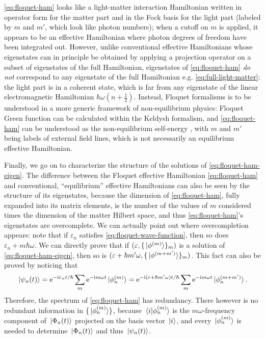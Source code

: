 \documentclass[hyperref, a4paper]{article}
\newcommand*{\ii}{\mathrm{i}}
\newcommand*{\ee}{\mathrm{e}}
\begin{document}
\eqref{eq:floquet-ham} looks like a light-matter interaction Hamiltonian 
written in operator form for the matter part 
and in the Fock basis for the light part (labeled by $m$ and $m'$, which look like photon numbers);
when a cutoff on $m$ is applied, 
it appears to be an effective Hamiltonian where photon degrees of freedom 
have been integrated out.
However, unlike conventional effective Hamiltonians
whose eigenstates can in principle be obtained by 
applying a projection operator on a subset of eigenstates of the full Hamiltonian,
eigenstates of \eqref{eq:floquet-ham} 
\emph{do not} correspond to any eigenstate of 
the full Hamiltonian e.g. \eqref{eq:full-light-matter}:
the light part is in a coherent state,
which is far from any eigenstate of the linear electromagnetic Hamiltonian $\hbar \omega (n + \frac{1}{2})$.
Instead, Floquet formalisms is to be understood in a more generic framework of non-equilibrium physics:
Floquet Green function can be calculated within the Keldysh formalism,
and \eqref{eq:floquet-ham} can be understood as the 
non-equilibrium self-energy \cite{lubatsch2019evolution,aoki2014nonequilibrium},
with $m$ and $m'$ being labels of external field lines,
which is not necessarily an equilibrium effective Hamiltonian.

Finally, we go on to characterize the structure of the solutions of  \eqref{eq:floquet-ham-eigen}.
The difference between the Floquet effective Hamiltonian \eqref{eq:floquet-ham}
and conventional, ``equilibrium'' effective Hamiltonians can also be seen  
by the structure of its eigenstates, 
because the dimension of \eqref{eq:floquet-ham}, fully expanded into its matrix elements,
is the number of the values of $m$ considered 
times the dimension of the matter Hilbert space,
and thus \eqref{eq:floquet-ham}'s eigenstates are overcomplete.
We can actually point out where overcompletion appears:
note that if $\varepsilon_n$ satisfies \eqref{eq:floquet-wave-function},
then so does $\varepsilon_n + m \hbar \omega$.
We can directly prove that if $(\varepsilon, \{\ket*{\phi^{(m)}}\}_m)$ 
is a solution of \eqref{eq:floquet-ham-eigen},
then so is $(\varepsilon + \hbar m' \omega, \{\ket*{\phi^{(m + m')}}\}_m)$.
This fact can also be proved by noticing that  
\begin{equation}
    \ket*{\psi_n(t)} = \ee^{- \ii \varepsilon_n t / \hbar} \sum_m \ee^{- \ii m \omega t} \ket*{\phi_n^{(m)}}
    = \ee^{- \ii (\varepsilon + \hbar m' \omega) t / \hbar}
    \sum_m \ee^{- \ii m \omega t} \ket*{\phi_n^{(m + m')}}.
\end{equation}
Therefore, the spectrum of \eqref{eq:floquet-ham} has redundancy. 
There however is no redundant information in $\{\ket*{\phi_n^{(m)}}\}$,
because $\braket*{i}{\phi_n^{(m)}}$ is the 
$m \omega$-frequency component of $\ket*{\Phi_n(t)}$
projected on the basis vector $\ket*{i}$,
and every $\ket*{\phi_n^{(m)}}$ is needed to determine $\ket*{\Phi_n(t)}$
and thus $\ket*{\psi_n(t)}$.
\end{document}
